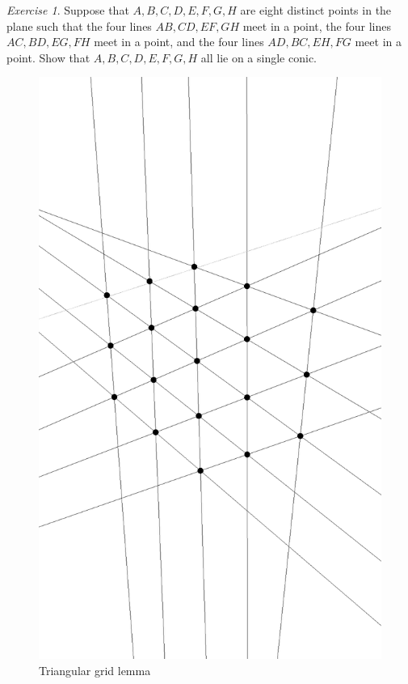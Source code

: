\documentclass[letterpaper,11pt]{article}
\theoremstyle{definition}
\theoremstyle{remark}
\newtheorem{exer}{Exercise}
\begin{document}
\begin{exer}\label{fourpairs} Suppose that $A,B,C,D,E,F,G,H$ are eight distinct points in the plane such that the four lines $AB, CD, EF, GH$ meet in a point, the four lines $AC, BD, EG, FH$ meet in a point, and the four lines $AD, BC, EH, FG$ meet in a point. Show that $A,B,C,D,E,F,G,H$ all lie on a single conic.
\end{exer}

\begin{figure}[!htb]
\centering
\includegraphics[scale=0.5,angle=270]{triangulargrid.eps}
\caption{Triangular grid lemma}
\end{figure}
\end{document}
